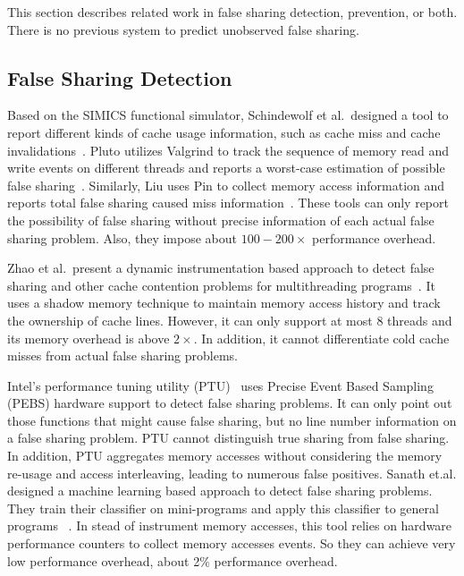 \label{sec:relatedwork}

This section describes related work in false sharing detection, prevention, or both. There is no previous
system to predict unobserved false sharing.

\subsection{False Sharing Detection}
Based on the SIMICS functional simulator, Schindewolf et al.\ designed a tool 
to report different kinds of cache usage information,
such as cache miss and cache invalidations~\cite{falseshare:simulator}.
Pluto utilizes Valgrind to track the sequence of memory read and write
events on different threads and reports a worst-case estimation of
possible false sharing~\cite{falseshare:binaryinstrumentation1}.
Similarly, Liu uses Pin to collect memory access information and
reports total false sharing caused miss information~\cite{falseshare:binaryinstrumentation2}.
These tools can only report the possibility of false sharing without precise information of each
actual false sharing problem.  
Also, they impose about $100-200\times$ performance overhead.

Zhao et al.\ present a dynamic instrumentation based approach to 
detect false sharing and other cache contention problems
for multithreading programs~\cite{qinzhaodetection}. 
It uses a shadow memory technique to maintain memory access history and track the ownership of 
cache lines. 
However, it can only support at most $8$ threads and its memory overhead 
is above $2\times$. In addition, it cannot differentiate cold cache misses from actual false sharing problems.

Intel's performance tuning utility (PTU)~\cite{detect:ptu, detect:intel} uses Precise Event Based Sampling (PEBS) hardware support to detect false sharing problems.  It can only point out those functions that might cause false sharing, but no line number information on a false sharing problem.  PTU cannot distinguish
true sharing from false sharing. In addition, PTU aggregates memory accesses without considering the memory re-usage and access interleaving, leading to numerous false positives. Sanath et.al. designed a machine learning based approach to detect false sharing problems. They train their classifier on mini-programs and apply this classifier to general programs ~\cite{mldetect}. 
In stead of instrument memory accesses, this tool relies on hardware performance counters to collect memory accesses events. So they can achieve very low performance overhead, about 2\% performance overhead. 

